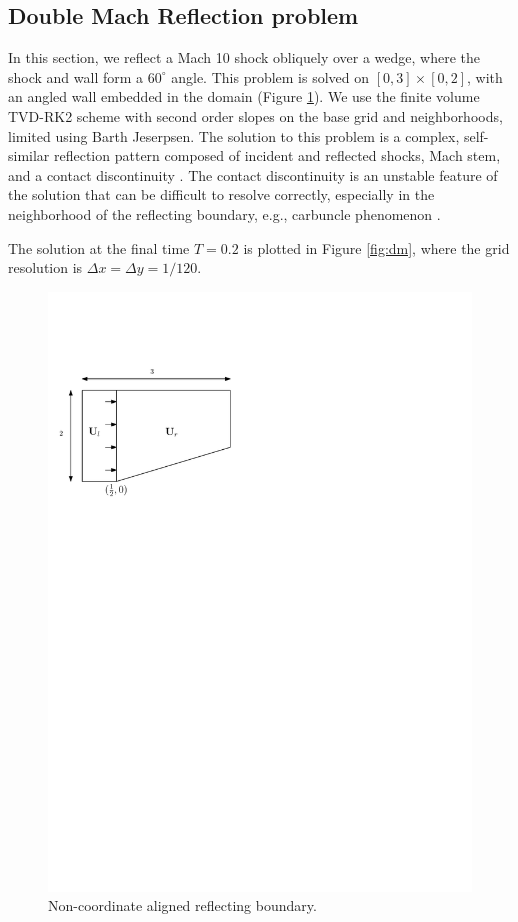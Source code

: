 \subsection{Double Mach Reflection problem}
In this section, we reflect a Mach 10 shock obliquely over a wedge, where the shock and wall form a $60^{\circ}$ angle.  
This problem is solved on $[0,3]\times[0,2]$, with an angled wall embedded in the domain (Figure \ref{fig:dmnca}).  
We use the finite volume TVD-RK2 scheme with second order slopes on the base grid and neighborhoods, limited using Barth Jeserpsen.
The solution to this problem is a complex, self-similar reflection pattern composed of incident and reflected shocks, Mach stem, and a contact discontinuity \cite{WOODWARD1984115}.  
The contact discontinuity is an unstable feature of the solution that can be difficult to resolve correctly, especially in the neighborhood of the reflecting boundary, e.g., carbuncle phenomenon \cite{KEMM2018596}.

The solution at the final time $T = 0.2$ is plotted in Figure \ref{fig:dm}, where the grid resolution is $\Delta x = \Delta y = 1/120$.


\begin{figure}
	\centering
	\includegraphics[width = 0.5\linewidth]{figs/dmnca}
	\caption{Non-coordinate aligned reflecting boundary.}\label{fig:dmnca}
\end{figure} 



